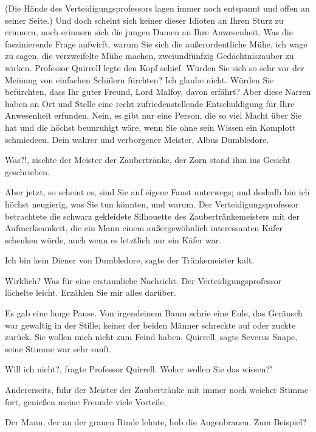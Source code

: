 (Die Hände des Verteidigungsprofessors lagen immer noch entspannt und offen an
seiner Seite.) \glqq Und doch scheint sich keiner dieser Idioten an Ihren Sturz
zu erinnern, noch erinnern sich die jungen Damen an Ihre Anwesenheit. Was die
faszinierende Frage aufwirft, warum Sie sich die außerordentliche Mühe, ich wage
zu sagen, die verzweifelte Mühe machen, zweiundfünfzig Gedächtniszauber zu
wirken.\grqq{} Professor Quirrell legte den Kopf schief. \glqq Würden Sie sich
so sehr vor der Meinung von einfachen Schülern fürchten? Ich glaube nicht.
Würden Sie befürchten, dass Ihr guter Freund, Lord Malfoy, davon erfährt? Aber
diese Narren haben an Ort und Stelle eine recht zufriedenstellende
Entschuldigung für Ihre Anwesenheit erfunden. Nein, es gibt nur eine Person, die
so viel Macht über Sie hat und die höchst beunruhigt wäre, wenn Sie ohne sein
Wissen ein Komplott schmiedeen. Dein wahrer und verborgener Meister, Albus
Dumbledore.\grqq{}

\glqq Was?!\grqq{}, zischte der Meister der Zaubertränke, der Zorn stand ihm ins
Gesicht geschrieben.

\glqq Aber jetzt, so scheint es, sind Sie auf eigene Faust unterwegs; und
deshalb bin ich höchst neugierig, was Sie tun könnten, und warum.\grqq{} Der
Verteidigungsprofessor betrachtete die schwarz gekleidete Silhouette des
Zaubertränkemeisters mit der Aufmerksamkeit, die ein Mann einem außergewöhnlich
interessanten Käfer schenken würde, auch wenn es letztlich nur ein Käfer war.

\glqq Ich bin kein Diener von Dumbledore\grqq{}, sagte der Tränkemeister kalt.

\glqq Wirklich? Was für eine erstaunliche Nachricht.\grqq{} Der
Verteidigungsprofessor lächelte leicht. \glqq Erzählen Sie mir alles
darüber.\grqq{}

Es gab eine lange Pause. Von irgendeinem Baum schrie eine Eule, das Geräusch war
gewaltig in der Stille; keiner der beiden Männer schreckte auf oder zuckte
zurück. \glqq Sie wollen mich nicht zum Feind haben, Quirrell\grqq{}, sagte
Severus Snape, seine Stimme war sehr sanft.

\glqq Will ich nicht?\grqq{}, fragte Professor Quirrell. \glqq Woher wollen Sie
das wissen?"

\glqq Andererseits\grqq{}, fuhr der Meister der Zaubertränke mit immer noch
weicher Stimme fort, \glqq genießen meine Freunde viele Vorteile.\grqq{}

Der Mann, der an der grauen Rinde lehnte, hob die Augenbrauen. \glqq Zum
Beispiel?\grqq{}

